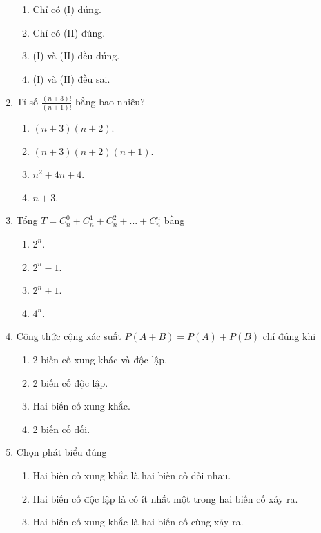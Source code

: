 \begin{enumerate}[label=\textbf{Câu \arabic*.},align=left,left=0cm..0cm,itemindent=*]
	\begin{enumerate}[label=\textbf{\Alph*.},align=left,left=1cm..0cm,itemindent=*]
		\item Chỉ có (I) đúng. \item Chỉ có (II) đúng. \item (I) và (II) đều đúng. \item (I) và (II) đều sai.
	\end{enumerate}
	\item Tỉ số $\frac{(n+3)!}{(n+1)!}$ bằng bao nhiêu?
	\begin{enumerate}[label=\textbf{\Alph*.},align=left,left=1cm..0cm,itemindent=*]
		\item $(n+3)(n+2)$. \item $(n+3)(n+2)(n+1)$. \item $n^2+4n+4$. \item $n+3$.
	\end{enumerate}
	\item Tổng $T=C_n^0+C_n^1+C_n^2+...+C_n^n$ bằng
	\begin{multicols}{4}\begin{enumerate}[label=\textbf{\Alph*.},align=left,left=1cm..0cm,itemindent=*]
		\item $2^n$. \item $2^n-1$. \item $2^n+1$. \item $4^n$.
	\end{enumerate}\end{multicols}
	\item Công thức cộng xác suất $P(A+B)=P(A)+P(B)$ chỉ đúng khi
	\begin{enumerate}[label=\textbf{\Alph*.},align=left,left=1cm..0cm,itemindent=*]
		\item 2 biến cố xung khác và độc lập.
		\item 2 biến cố độc lập.
		\item Hai biến cố xung khắc.
		\item 2 biến cố đối.
	\end{enumerate}
	\item Chọn phát biểu đúng
	\begin{enumerate}[label=\textbf{\Alph*.},align=left,left=1cm..0cm,itemindent=*]
		\item Hai biến cố xung khắc là hai biến cố đối nhau.
		\item Hai biến cố độc lập là có ít nhất một trong hai biến cố xảy ra.
		\item Hai biến cố xung khắc là hai biến cố cùng xảy ra.

\end{enumerate}
\end{enumerate}

